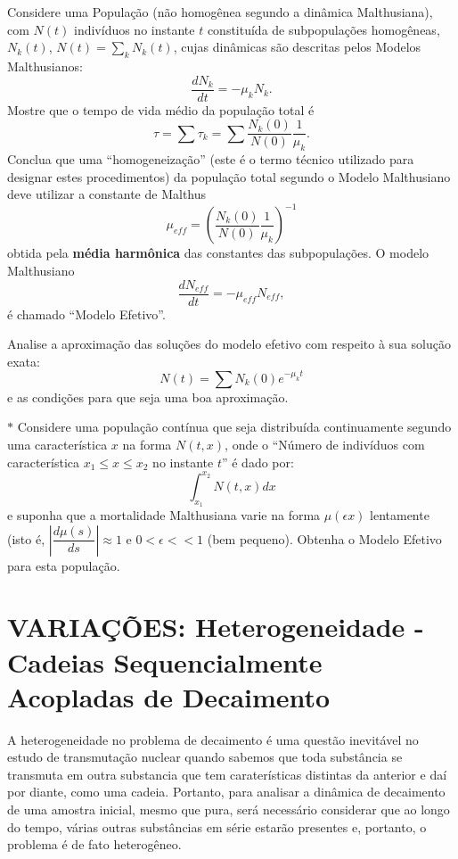 
    \begin{exercise}
    Considere uma População (não homogênea segundo a dinâmica Malthusiana), com \(N(t)\) indivíduos no instante \(t\) constituída de subpopulações homogêneas, \(N_k(t)\), \(N(t) = \sum_{k} N_k(t)\), cujas dinâmicas são descritas pelos Modelos Malthusianos:
    \[\dfrac{dN_k}{dt} = -\mu_k N_k.\]
    Mostre que o tempo de vida médio da população total é
    \[\tau = \sum \tau_k = \sum \dfrac{N_k(0)}{N(0)}\dfrac{1}{\mu_k}.\]
    Conclua que uma ``homogeneização'' (este é o termo técnico utilizado para designar estes procedimentos) da população total segundo o Modelo Malthusiano deve utilizar a constante de Malthus
    \[\mu_{eff} = \left(\dfrac{N_k(0)}{N(0)}\dfrac{1}{\mu_k}\right)^{-1}\]
    obtida pela \textbf{média harmônica} das constantes das subpopulações. O modelo Malthusiano
    \[\dfrac{dN_{eff}}{dt} = -\mu_{eff} N_{eff},\]
    é chamado ``Modelo Efetivo''.
    \end{exercise}

    \begin{exercise}
    Analise a aproximação das soluções do modelo efetivo com respeito à sua solução exata:
    \[N(t) = \sum N_k(0) e^{-\mu_k t}\]
    e as condições para que seja uma boa aproximação. 
    \end{exercise}
    
    \begin{exercise}\(\ast\)
    Considere uma população contínua que seja distribuída continuamente segundo uma característica \(x\) na forma \(N(t, x)\), onde o ``Número de indivíduos com característica \(x_1 \le x \le x_2\) no instante \(t\)'' é dado por:
    \[\int_{x_1}^{x_2} N(t, x)  dx\]
    e suponha que a mortalidade Malthusiana varie na forma \(\mu(\epsilon x)\) lentamente (isto é, \(\left|\dfrac{d\mu(s)}{ds}\right| \approx 1\) e \(0 < \epsilon << 1\) (bem pequeno). Obtenha o Modelo Efetivo para esta população.
    \end{exercise}

\section{VARIAÇÕES: Heterogeneidade - Cadeias Sequencialmente Acopladas de Decaimento}

    A heterogeneidade no problema de decaimento é uma questão inevitável no estudo de transmutação nuclear quando sabemos que toda substância se transmuta em outra substancia que tem caraterísticas distintas da anterior e daí por diante, como uma cadeia. Portanto, para analisar a dinâmica de decaimento de uma amostra inicial, mesmo que pura, será necessário considerar que ao longo do tempo, várias outras substâncias em série estarão presentes e, portanto, o problema é de fato heterogêneo.

